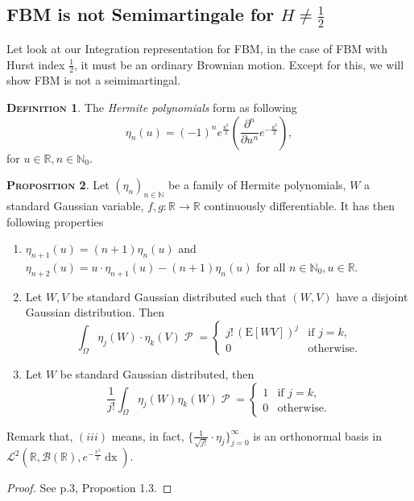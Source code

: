 \documentclass[a4paper, twoside, 11pt]{article}
\theoremstyle{definition}
\newtheorem{definition}{\scshape Definition}[section]
\newtheorem{proposition}[definition]{\scshape Proposition}
\begin{document}
\subsection{FBM is not Semimartingale for $H\neq \frac{1}{2}$}
Let look at our Integration representation for FBM, in the case of FBM with Hurst index $\frac{1}{2}$, it must be an ordinary Brownian motion. Except for this, we will show FBM is not a seimimartingal.
\begin{definition}
  The \emph{Hermite polynomials} form as following
  \begin{equation}
	\eta_n(u) = (-1)^n e^{\frac{u^2}{2}} (\frac{\partial^n }{\partial u^n}e^{-\frac{u^2}{2}}),
	\label{sec:hermite}
  \end{equation}
  for $u\in \mathbb{R}, n\in \mathbb{N}_0$. 
\end{definition}
\begin{proposition}
  Let $(\eta_n)_{n\in \mathbb{N}}$ be a family of Hermite polynomials, $W$ a standard Gaussian variable, $f, g: \mathbb{R}\rightarrow \mathbb{R}$ continuously differentiable. It has then following properties 
  \begin{enumerate}[topsep=0pt, itemsep=-1ex, partopsep=1ex, parsep=1ex, label=(\roman*)]
	\item $\eta_{n+1}(u)=(n+1)\eta_n(u)$ and $\eta_{n+2}(u)=u\cdot\eta_{n+1}(u) - (n+1)\eta_n(u)$ for all $n\in\mathbb{N}_0, u\in\mathbb{R}$.
	\item Let $W, V$ be standard Gaussian distributed such that $(W, V)$ have a disjoint Gaussian distribution. Then
	  \begin{equation*}
		\int_{\Omega} \eta_j(W)\cdot\eta_k(V) \mathop{\mathcal{P}} = \begin{cases} j!\,(\mathrm{E}[WV])^j & \mbox{if } j=k,\\
		  0 &\text{otherwise}.
		\end{cases}
	  \end{equation*}
	\item Let $W$ be standard Gaussian distributed, then
	  \begin{equation*}
		\frac{1}{j!} \int_\Omega \eta_j(W) \eta_k(W) \mathop{\mathcal{P}} = \begin{cases} 1 & \mbox{if } j=k,\\
		  0 & \text{otherwise}.
		\end{cases}
	  \end{equation*}
\end{enumerate}
Remark that, $(iii)$ means, in fact, $\{\frac{1}{\sqrt{j!}}\cdot\eta_j\}_{j=0}^{\infty}$ is an orthonormal basis in $\mathcal{L}^2(\mathbb{R}, \mathscr{B}(\mathbb{R}), e^{-\frac{x^2}{2}}\mathop{dx})$.
		\label{sec:herpro}
\end{proposition}
\begin{proof}
  See \cite{nourdin} p.3, Propostion 1.3.
\end{proof}
\end{document}
